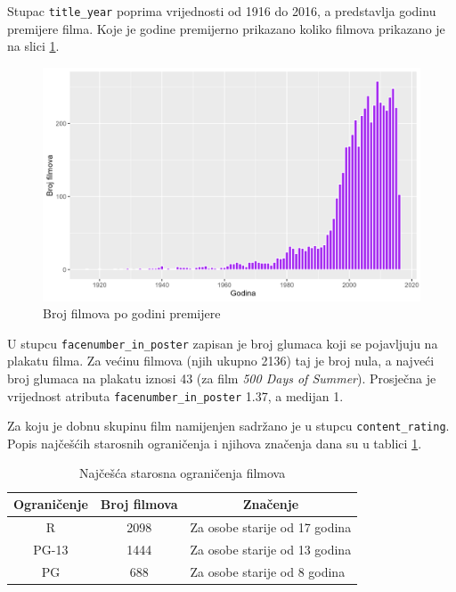 	 Stupac \texttt{title\_year} poprima vrijednosti od 1916 do 2016, a predstavlja godinu premijere filma. Koje je godine premijerno prikazano koliko filmova prikazano je na slici \ref{filmovi_godine}.
	 
	  \begin{figure}[H]
	 	\centering
	 	\includegraphics[width=15cm]{../figures/analysis/broj_filmova_po_godini.png}
	 	\caption{Broj filmova po godini premijere}
	 	\label{filmovi_godine}
	 \end{figure}
	 
	 U stupcu \texttt{facenumber\_in\_poster} zapisan je broj glumaca koji se pojavljuju na plakatu filma. Za većinu filmova (njih ukupno 2136) taj je broj nula, a najveći broj glumaca na plakatu iznosi 43 (za film \textit{500 Days of Summer}). Prosječna je vrijednost atributa \texttt{facenumber\_in\_poster} 1.37, a medijan 1.
	 
	 Za koju je dobnu skupinu film namijenjen sadržano je u stupcu \texttt{content\_rating}. Popis najčešćih starosnih ograničenja i njihova značenja dana su u tablici \ref{content_rating}.
	 
	 \begin{table}[H]
	 	\centering
	 	\renewcommand{\arraystretch}{1.5} %
	 	\begin{tabular}{|c|c|l|}
	 		\hline
	 		\multicolumn{1}{|c|}{\textbf{Ograničenje}} & \multicolumn{1}{c|}{\textbf{Broj filmova}} & \multicolumn{1}{c|}{\textbf{Značenje}} \\
	 		\hline
	 		R & 2098 & Za osobe starije od 17 godina \\
	 		\hline 
	 		PG-13 & 1444 & Za osobe starije od 13 godina \\
	 		\hline
	 		PG & 688 & Za osobe starije od 8 godina \\
	 		\hline
	 	\end{tabular}
	 	\caption{Najčešća starosna ograničenja filmova}
	 	\label{content_rating}
	 \end{table}
	 
